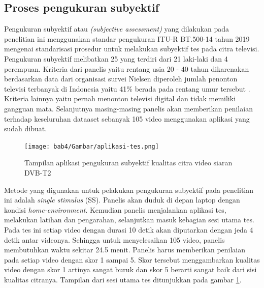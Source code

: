 \subsection{Proses pengukuran subyektif }
\hspace{1.2cm}
Pengukuran subyektif atau \textit{(subjective assessment)} yang dilakukan pada penelitian ini menggunakan standar pengukuran ITU-R BT.500-14 tahun 2019 mengenai standarisasi prosedur untuk melakukan subyektif tes pada citra televisi. Pengukuran subyektif melibatkan 25 yang terdiri dari 21 laki-laki dan 4 perempuan.  Kriteria dari panelis yaitu rentang usia 20 - 40 tahun dikarenakan berdasarkan data dari organisasi survei Nielsen diperoleh jumlah penonton televisi terbanyak di Indonesia yaitu 41\% berada pada rentang umur tersebut \citep{Annur2023}. Kriteria lainnya yaitu pernah menonton televisi digital dan tidak memiliki gangguan mata. Selanjutnya masing-masing panelis akan memberikan penilaian terhadap keseluruhan dataaset sebanyak 105 video menggunakan aplikasi yang sudah dibuat.

\begin{figure}[H]
	\vspace{-0.1cm}
	\begin{center}
		\texttt{[image: bab4/Gambar/aplikasi-tes.png]}
	\end{center}
	\vspace{-0.2cm}
	\caption{Tampilan aplikasi pengukuran subyektif kualitas citra video siaran DVB-T2}
	\label{aplikasi-tes}
\end{figure}

Metode yang digunakan untuk pelakukan pengukuran subyektif pada penelitian ini adalah \textit{single stimulus} (SS). Panelis akan duduk di depan laptop dengan kondisi \textit{home-environment}. Kemudian panelis menjalankan aplikasi tes, melakukan latihan dan pengarahan, selanjutkan masuk kebagian sesi utama tes. Pada tes ini setiap video dengan durasi 10 detik akan diputarkan dengan jeda 4 detik antar videonya. Sehingga untuk menyelesaikan 105 video, panelis membutuhkan waktu sekitar 24.5 menit. Panelis harus memberikan penilaian pada setiap video dengan skor 1 sampai 5. Skor tersebut menggambarkan kualitas video dengan skor 1 artinya sangat buruk dan skor 5 berarti sangat baik dari sisi kualitas citranya. Tampilan dari sesi utama tes ditunjukkan pada gambar \ref{aplikasi-tes}.

